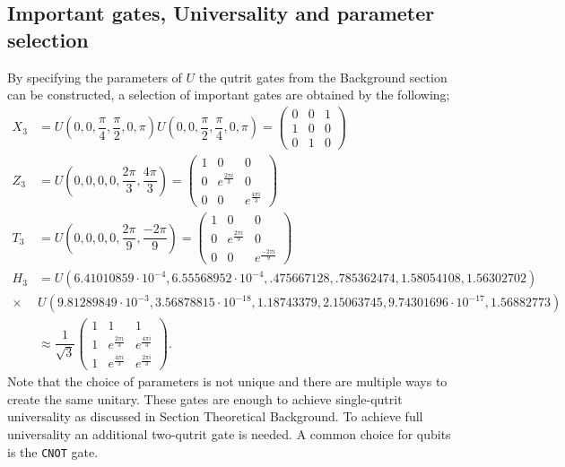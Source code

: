 \subsection{Important gates, Universality and parameter selection}
By specifying the parameters of $U$ the qutrit gates from the Background section can be constructed, a selection of important gates are obtained by the following;
\begin{equation}
\begin{aligned}
X_3 &= U(0,0,\dfrac{\pi}{4},\dfrac{\pi}{2},0,\pi)U(0,0,\dfrac{\pi}{2},\dfrac{\pi}{4},0,\pi) 
= \begin{pmatrix}
0&0&1
\\
1&0&0
\\
0&1&0
\end{pmatrix}
\\ 
Z_3 &= U(0,0,0,0,\dfrac{2\pi}{3},\dfrac{4\pi}{3})
= \begin{pmatrix}
1&0&0
\\
0&e^{\frac{2\pi i}{3}}&0
\\
0&0&e^{\frac{4\pi i}{3}}
\end{pmatrix}
\\
T_3 &= U(0,0,0,0,\dfrac{2\pi}{9},\dfrac{-2\pi}{9})
= \begin{pmatrix}
1&0&0
\\
0&e^{\frac{2\pi i}{9}}&0
\\
0&0&e^{\frac{-2\pi i}{9}}
\end{pmatrix}
\\
H_3 &= U(6.41010859\cdot 10^{-4}, 6.55568952\cdot 10^{-4}, .475667128, .785362474, 1.58054108, 1.56302702)\\ \times &U(9.81289849\cdot 10^{-3}, 3.56878815\cdot 10^{-18},1.18743379, 2.15063745, 9.74301696\cdot 10^{-17}, 1.56882773)\\
&\approx \dfrac{1}{\sqrt{3}}\begin{pmatrix}
1&1&1
\\
1&e^{\frac{2\pi i}{3}}&e^{\frac{4\pi i}{3}}
\\
1&e^{\frac{4\pi i}{3}}&e^{\frac{2\pi i}{3}}
\end{pmatrix}.
\end{aligned}
\end{equation}
Note that the choice of parameters is not unique and there are multiple ways to create the same unitary. These gates are enough to achieve single-qutrit universality as discussed in Section Theoretical Background. To achieve full universality an additional two-qutrit gate is needed. A common choice for qubits is the {\tt CNOT} gate\cite{qudit}.

